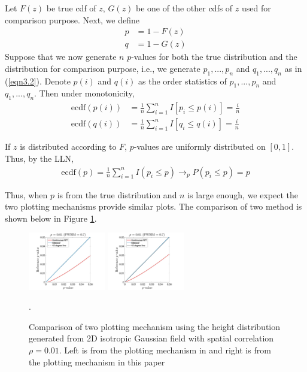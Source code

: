 \documentclass{article}
\begin{document}
Let $F(z)$ be true cdf of $z$, $G(z)$ be one of the other cdfs of $z$ used for comparison purpose. Next, we define
\begin{align*}
    p &= 1-F(z)\\
    q &= 1-G(z)
\end{align*}
Suppose that we now generate $n$ $p$-values for both the true distribution and the distribution for comparison purpose, i.e., we generate $p_1,...,p_n$ and $q_1,...,q_n$ as in (\ref{eqn3.2}). Denote $p(i)$ and $q(i)$ as the order statistics of $p_1,...,p_n$ and $q_1,...,q_n$. Then under monotonicity, 
\begin{align*}
    \text{ecdf}(p(i)) &= \frac{1}{n}\sum_{i = 1}^n I[p_i \leq p(i)] = \frac{i}{n}\\
    \text{ecdf}(q(i)) &= \frac{1}{n}\sum_{i = 1}^n I[q_i \leq q(i)] = \frac{i}{n}
\end{align*}

If $z$ is distributed according to $F$, $p$-values are uniformly distributed on $[0,1]$. Thus, by the LLN,
\begin{align*}
    \text{ecdf}(p) = \frac{1}{n}\sum_{i=1}^nI(p_i\leq p)\rightarrow_p P(p_i\leq p) = p
\end{align*}

Thus, when $p$ is from the true distribution and $n$ is large enough, we expect the two plotting mechanisms provide similar plots. The comparison of two method is shown below in Figure \ref{fig18}.

\begin{figure}[!htp]
\centering
\includegraphics[trim=80 5 80 5, clip,width=0.3\textwidth]{figure/Armin_Fabian_method.jpg}
\includegraphics[trim=80 5 80 5, clip,width=0.3\textwidth]{figure/new_method.jpg}
\caption{Comparison of two plotting mechanism using the height distribution generated from 2D isotropic Gaussian field with spatial correlation $\rho = 0.01$. Left is from the plotting mechanism in \cite{schwartzman2019peak} and right is from the plotting mechanism in this paper \label{fig18}}.
\end{figure}
\end{document}
